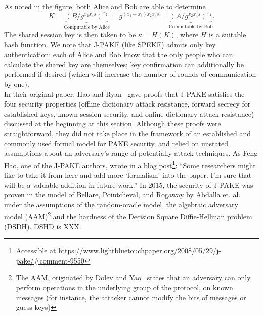  As noted in the figure, both Alice and Bob are able to determine 
 \[ K = \underbrace{\left(B / g^{x_2x_4 s} \right)^{x_2}}_\text{Computable by Alice} = g^{(x_1+x_3)x_2x_4s} = 
 \underbrace{\left(A / g^{x_2x_4 s} \right)^{x_4}}_\text{Computable by Bob}. \]
 The shared session key is then taken to be $\kappa = H(K)$, where $H$ is a suitable hash function. 
 We note that J-PAKE (like SPEKE) admits only key authentication: each of Alice and 
 Bob know that the only people who can calculate the shared key are themselves; key confirmation can additionally be 
 performed if desired (which will increase the number of rounds of communication by one).
 \\

 In their original paper, Hao and Ryan~\cite{HaRy2010} gave proofs that J-PAKE satisfies the four security properties 
 (offline dictionary attack resistance, forward secrecy for established keys, known session security, and online dictionary attack resistance) 
discussed at the beginning at this section.  Although these proofs were straightforward, they did not take place in the framework of an established
and commonly used formal model for PAKE security, and relied on unstated assumptions about an adversary's range of potentially attack 
techniques.  As Feng Hao, one of the J-PAKE authors, wrote in a blog post\footnote{Accessible at 
\url{https://www.lightbluetouchpaper.org/2008/05/29/j-pake/\#comment-9550}}:
``Some researchers might like to take it from here and add more `formalism' into the paper.  I'm sure that will be a valuable addition in future work.''
In 2015, the security of J-PAKE was proven in the model of Bellare, Pointcheval, and Rogaway by Abdalla et. al.~\cite{AbdBenMac15} under the
assumptions of the random-oracle model, the algebraic adversary model (AAM)\footnote{The AAM, originated by Dolev and Yao~\cite{DoYa83} states that an adversary can only perform operations in the underlying group of the protocol, on known messages (for instance, the attacker cannot modify the bits of messages or guess keys)} and the hardness of the Decision Square Diffie-Hellman problem (DSDH). DSHD is XXX.  


